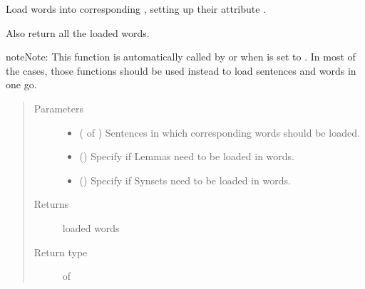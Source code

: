 \documentclass[letterpaper,10pt,english]{sphinxmanual}
\begin{document}
\begin{fulllineitems}
\label{\detokenize{load:loacore.load.word_load.load_words_in_sentences}}
Load words into corresponding , setting up their attribute .

Also return all the loaded words.

\begin{sphinxadmonition}{note}{Note:}
This function is automatically called by  or
 when  is set to .
In most of the cases, those functions should be used instead to load sentences and words in one go.
\end{sphinxadmonition}
\begin{quote}\begin{description}
\item[{Parameters}] \leavevmode\begin{itemize}
\item {} 
 ( of {\hyperref[\detokenize{classes:loacore.classes.classes.Sentence}]{}}) \textendash{} Sentences in which corresponding words should be loaded.

\item {} 
 () \textendash{} Specify if Lemmas need to be loaded in words.

\item {} 
 () \textendash{} Specify if Synsets need to be loaded in words.

\end{itemize}

\item[{Returns}] \leavevmode
loaded words

\item[{Return type}] \leavevmode
{} of {\hyperref[\detokenize{classes:loacore.classes.classes.Word}]{}}

\end{description}\end{quote}

\end{fulllineitems}
\end{document}
